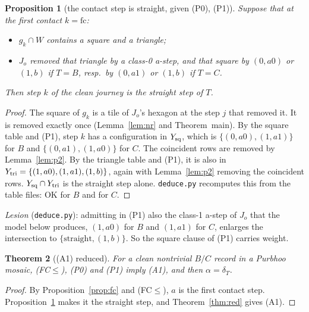 \documentclass[11pt]{article}
\newtheorem{theorem}{Theorem}\newtheorem{lemma}[theorem]{Lemma}\newtheorem{proposition}[theorem]{Proposition}
\theoremstyle{definition}\newtheorem{definition}[theorem]{Definition}\newtheorem{remark}[theorem]{Remark}
\begin{document}
\begin{proposition}[the contact step is straight, given (P0), (P1)]\label{prop:cs}
Suppose that at the first contact $k=\mathrm{fc}$:
\begin{itemize}
\item[\textbf{(P0)}] $g_k\cap W$ contains a square and a triangle;
\item[\textbf{(P1)}] $J_o$ removed that triangle by a class-0 a-step, and that square by $(0,a0)$ or $(1,b)$ if $T=B$, resp.\ by $(0,a1)$ or $(1,b)$ if $T=C$.
\end{itemize}
Then step $k$ of the clean journey is the straight step of $T$.
\end{proposition}
\begin{proof}
The square of $g_k$ is a tile of $J_o$'s hexagon at the step $j$ that removed it. It is removed exactly once (Lemma~\ref{lem:nr} and Theorem~main). By the square table and (P1), step $k$ has a configuration in $Y_{\rm sq}$, which is $\{(0,a0),(1,a1)\}$ for $B$ and $\{(0,a1),(1,a0)\}$ for $C$. The coincident rows are removed by Lemma~\ref{lem:p2}.
By the triangle table and (P1), it is also in $Y_{\rm tri}=\{(1,a0),(1,a1),(1,b)\}$, again with Lemma~\ref{lem:p2} removing the coincident rows.
$Y_{\rm sq}\cap Y_{\rm tri}$ is the straight step alone. \texttt{deduce.py} recomputes this from the table files: OK for $B$ and for $C$.
\end{proof}
\noindent\emph{Lesion} (\texttt{deduce.py}): admitting in (P1) also the class-1 a-step of $J_o$ that the model below produces, $(1,a0)$ for $B$ and $(1,a1)$ for $C$, enlarges the intersection to $\{\text{straight},(1,b)\}$. So the square clause of (P1) carries weight.

\begin{theorem}[(A1) reduced]\label{thm:main}
For a clean nontrivial $B/C$ record in a Purbhoo mosaic, (FC$\le$), (P0) and (P1) imply (A1), and then $\alpha=\delta_T$.
\end{theorem}
\begin{proof}
By Proposition~\ref{prop:fc} and (FC$\le$), $a$ is the first contact step. Proposition~\ref{prop:cs} makes it the straight step, and Theorem~\ref{thm:red} gives (A1).
\end{proof}
\end{document}
